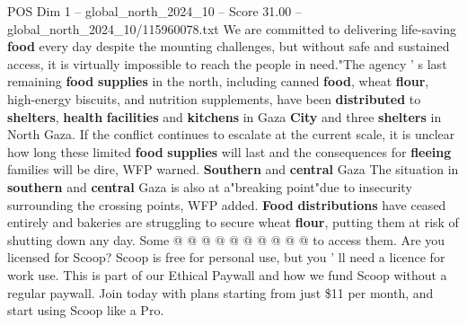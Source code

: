 \begin{textsample}{POS Dim 1 – global\_north\_2024\_10 – Score 31.00 – global\_north\_2024\_10/115960078.txt}
We are committed to delivering life-saving \textbf{food} every day despite the mounting challenges, but without safe and sustained access, it is virtually impossible to reach the people in need."The agency ' s last remaining \textbf{food} \textbf{supplies} in the north, including canned \textbf{food}, wheat \textbf{flour}, high-energy biscuits, and nutrition supplements, have been \textbf{distributed} to \textbf{shelters}, \textbf{health} \textbf{facilities} and \textbf{kitchens} in Gaza \textbf{City} and three \textbf{shelters} in North Gaza.
If the conflict continues to escalate at the current scale, it is unclear how long these limited \textbf{food} \textbf{supplies} will last and the consequences for \textbf{fleeing} families will be dire, WFP warned. \textbf{Southern} and \textbf{central} Gaza The situation in \textbf{southern} and \textbf{central} Gaza is also at a"breaking point"due to insecurity surrounding the crossing points, WFP added. \textbf{Food} \textbf{distributions} have ceased entirely and bakeries are struggling to secure wheat \textbf{flour}, putting them at risk of shutting down any day.
Some @ @ @ @ @ @ @ @ @ @ to access them.
Are you licensed for Scoop?
Scoop is free for personal use, but you ' ll need a licence for work use.
This is part of our Ethical Paywall and how we fund Scoop without a regular paywall.
Join today with plans starting from just \$11 per month, and start using Scoop like a Pro.

\end{textsample}
